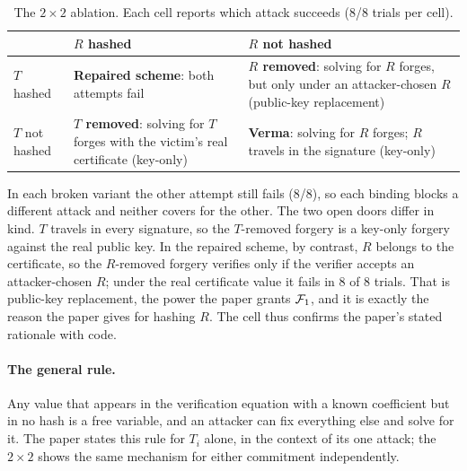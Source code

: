 \begin{table}[ht]
\centering\small
\caption{The $2\times2$ ablation. Each cell reports which attack succeeds (8/8 trials per cell).}
\label{tab:2x2}
\begin{tabularx}{\linewidth}{lXX}
\toprule
& $R$ hashed & $R$ not hashed \\
\midrule
$T$ hashed & \textbf{Repaired scheme}: both attempts fail &
  \textbf{$R$ removed}: solving for $R$ forges, but only under an attacker-chosen $R$ (public-key replacement) \\
$T$ not hashed & \textbf{$T$ removed}: solving for $T$ forges with the victim's real certificate (key-only) &
  \textbf{Verma}: solving for $R$ forges; $R$ travels in the signature (key-only) \\
\bottomrule
\end{tabularx}
\end{table}

In each broken variant the other attempt still fails (8/8), so each binding blocks a different attack
and neither covers for the other. The two open doors differ in kind. $T$ travels in every signature, so
the $T$-removed forgery is a key-only forgery against the real public key. In the repaired scheme, by
contrast, $R$ belongs to the certificate, so the $R$-removed forgery verifies only if the verifier
accepts an attacker-chosen $R$; under the real certificate value it fails in 8 of 8 trials. That is
public-key replacement, the power the paper grants $\mathcal{F}_1$, and it is exactly the reason the paper gives
for hashing $R$. The cell thus confirms the paper's stated rationale with code.

\paragraph{The general rule.} Any value that appears in the verification equation with a known
coefficient but in no hash is a free variable, and an attacker can fix everything else and solve for it.
The paper states this rule for $T_i$ alone, in the context of its one attack; the $2\times2$ shows the
same mechanism for either commitment independently.
